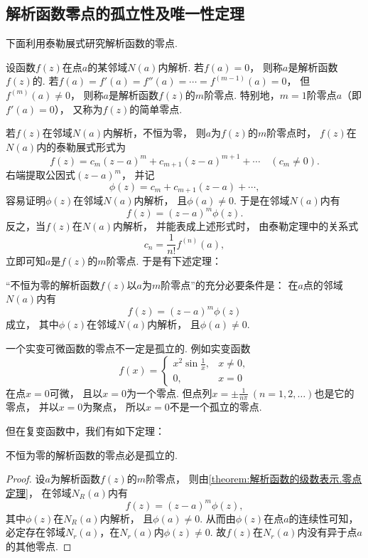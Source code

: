 \subsection{解析函数零点的孤立性及唯一性定理}
下面利用泰勒展式研究解析函数的零点.
\begin{definition}\label{definition:解析函数的级数表示.零点}
设函数\(f(z)\)在点\(a\)的某邻域\(N(a)\)内解析.
若\(f(a)=0\)，
则称\(a\)是解析函数\(f(z)\)的.
若\(f(a)=f'(a)=f''(a)=\dotsb=f^{(m-1)}(a)=0\)，
但\(f^{(m)}(a)\neq0\)，
则称\(a\)是解析函数\(f(z)\)的\(m\)阶零点.
特别地，\(m=1\)阶零点\(a\)（即\(f'(a)=0\)），
又称为\(f(z)\)的简单零点.
\end{definition}

若\(f(z)\)在邻域\(N(a)\)内解析，不恒为零，
则\(a\)为\(f(z)\)的\(m\)阶零点时，
\(f(z)\)在\(N(a)\)内的泰勒展式形式为\[
	f(z) = c_m (z-a)^m + c_{m+1} (z-a)^{m+1} + \dotsb \quad(c_m\neq0).
\]
右端提取公因式\((z-a)^m\)，
并记\[
	\phi(z) = c_m + c_{m+1} (z-a) + \dotsb,
\]
容易证明\(\phi(z)\)在邻域\(N(a)\)内解析，
且\(\phi(a)\neq0\).
于是在邻域\(N(a)\)内有\[
	f(z) = (z-a)^m \phi(z).
\]
反之，当\(f(z)\)在\(N(a)\)内解析，
并能表成上述形式时，
由泰勒定理中的关系式\[
	c_n = \frac{1}{n!} f^{(n)}(a),
\]
立即可知\(a\)是\(f(z)\)的\(m\)阶零点.
于是有下述定理：
\begin{theorem}\label{theorem:解析函数的级数表示.零点定理}
“不恒为零的解析函数\(f(z)\)以\(a\)为\(m\)阶零点”的充分必要条件是：
在\(a\)点的邻域\(N(a)\)内有\[
	f(z) = (z-a)^m \phi(z)
\]成立，
其中\(\phi(z)\)在邻域\(N(a)\)内解析，
且\(\phi(a)\neq0\).
\end{theorem}

一个实变可微函数的零点不一定是孤立的.
例如实变函数\[
	f(x) = \left\{ \begin{array}{cl}
		x^2 \sin\frac{1}{x}, & x\neq0, \\
		0, & x=0
	\end{array} \right.
\]在点\(x=0\)可微，
且以\(x=0\)为一个零点.
但点列\(x = \pm\frac{1}{n\pi}\ (n=1,2,\dotsc)\)也是它的零点，
并以\(x = 0\)为聚点，
所以\(x = 0\)不是一个孤立的零点.

但在复变函数中，我们有如下定理：
\begin{theorem}\label{theorem:解析函数的级数表示.解析函数的零点的孤立性}
不恒为零的解析函数的零点必是孤立的.
\begin{proof}
设\(a\)为解析函数\(f(z)\)的\(m\)阶零点，
则由\cref{theorem:解析函数的级数表示.零点定理}，
在邻域\(N_R(a)\)内有\[
	f(z) = (z-a)^m \phi(z),
\]
其中\(\phi(z)\)在\(N_R(a)\)内解析，
且\(\phi(a)\neq0\).
从而由\(\phi(z)\)在点\(a\)的连续性可知，
必定存在邻域\(N_r(a)\)，在\(N_r(a)\)内\(\phi(z)\neq0\).
故\(f(z)\)在\(N_r(a)\)内没有异于点\(a\)的其他零点.
\end{proof}
\end{theorem}

